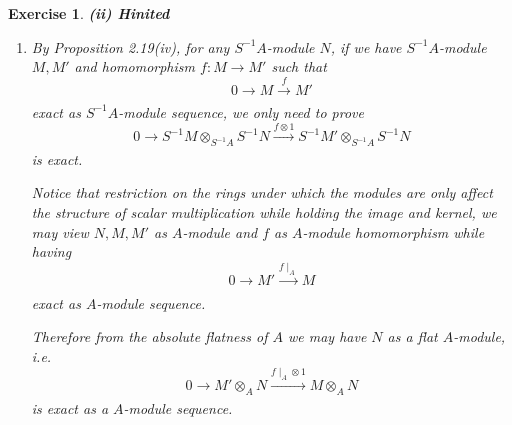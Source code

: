 \documentclass{article}
\theoremstyle{breakstyle}
\newtheorem{exercise}{Exercise}
\begin{document}
\begin{exercise}
    \textbf{\emph{(ii)} Hinited}
    \begin{enumerate}[label=({\roman*})]
        \item 
            By \emph{Proposition 2.19(iv)},
            for any $S^{-1}A$-module $N$,
            if we have $S^{-1}A$-module $M,M'$ and homomorphism $f:M\longrightarrow M'$ such that
            $$
            0\rightarrow M\xrightarrow[]{f} M'
            $$
            exact as $S^{-1}A$-module sequence, we only need to prove
            $$
            0\longrightarrow S^{-1}M\otimes _{S^{-1}A}S^{-1}N\xrightarrow[]{f\otimes 1} S^{-1}M'\otimes _{S^{-1}A}S^{-1}N
            $$
            is exact.

            Notice that restriction on the rings under which the modules are only affect the structure of scalar multiplication while holding the image and kernel,
            we may view $N,M,M'$ as $A$-module and $f$ as $A$-module homomorphism while having
            $$
            0\rightarrow M'\xrightarrow[]{f\mid _{A}} M
            $$
            exact as $A$-module sequence.

            Therefore from the absolute flatness of $A$ we may have $N$ as a flat $A$-module, i.e.
            $$
            0\longrightarrow M'\otimes _{A}N\xrightarrow[]{f\mid _{A}\otimes 1} M\otimes _{A}N
            $$
            is exact as a $A$-module sequence.


\end{enumerate}
\end{exercise}
\end{document}
